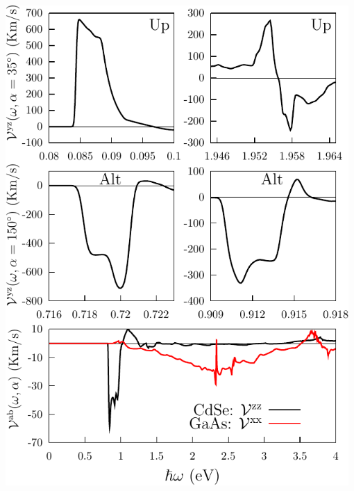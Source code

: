 \documentclass{beamer}
\begin{document}
\begin{frame}
{\begin{columns}
\includegraphics[width=0.98\textwidth]{figs/plots/fig3.pdf}

\end{columns}


}
\end{frame}

    
\end{document}
